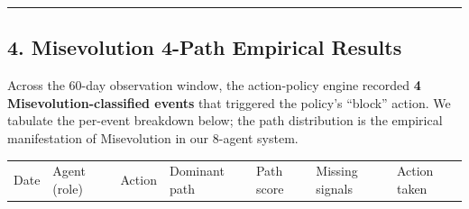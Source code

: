 \begin{center}\rule{0.5\linewidth}{0.5pt}\end{center}

\subsection{4. Misevolution 4-Path Empirical
Results}\label{misevolution-4-path-empirical-results}

Across the 60-day observation window, the action-policy engine recorded
\textbf{4 Misevolution-classified events} that triggered the policy's
``block'' action. We tabulate the per-event breakdown below; the path
distribution is the empirical manifestation of Misevolution in our
8-agent system.

{\def\LTcaptype{none} %
\begin{longtable}[]{@{}
  >{\raggedright\arraybackslash}p{}
  >{\raggedright\arraybackslash}p{}
  >{\raggedright\arraybackslash}p{}
  >{\raggedright\arraybackslash}p{}
  >{\raggedright\arraybackslash}p{}
  >{\raggedright\arraybackslash}p{}
  >{\raggedright\arraybackslash}p{}@{}}
\toprule\noalign{}
\begin{minipage}[b]{\linewidth}\raggedright
Date
\end{minipage} & \begin{minipage}[b]{\linewidth}\raggedright
Agent (role)
\end{minipage} & \begin{minipage}[b]{\linewidth}\raggedright
Action
\end{minipage} & \begin{minipage}[b]{\linewidth}\raggedright
Dominant path
\end{minipage} & \begin{minipage}[b]{\linewidth}\raggedright
Path score
\end{minipage} & \begin{minipage}[b]{\linewidth}\raggedright
Missing signals
\end{minipage} & \begin{minipage}[b]{\linewidth}\raggedright
Action taken
\end{minipage} \\

\end{longtable}}

